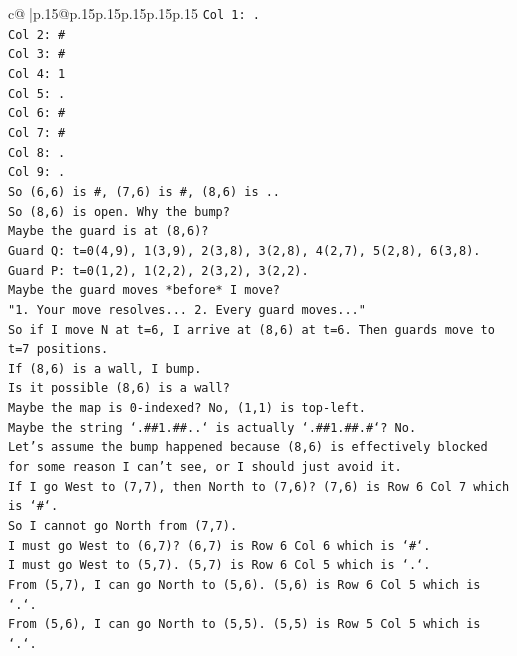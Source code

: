 \documentclass{article}
\begin{document}
{\begin{supertabular}{c@{$\;$}|p{.15\linewidth}@{}p{.15\linewidth}p{.15\linewidth}p{.15\linewidth}p{.15\linewidth}p{.15\linewidth}}
{{{\texttt{Col 1: .} \\
\texttt{Col 2: \#} \\
\texttt{Col 3: \#} \\
\texttt{Col 4: 1} \\
\texttt{Col 5: .} \\
\texttt{Col 6: \#} \\
\texttt{Col 7: \#} \\
\texttt{Col 8: .} \\
\texttt{Col 9: .} \\
\texttt{So (6,6) is \#, (7,6) is \#, (8,6) is ..} \\
\texttt{So (8,6) is open. Why the bump?} \\
\texttt{Maybe the guard is at (8,6)?} \\
\texttt{Guard Q: t=0(4,9), 1(3,9), 2(3,8), 3(2,8), 4(2,7), 5(2,8), 6(3,8).} \\
\texttt{Guard P: t=0(1,2), 1(2,2), 2(3,2), 3(2,2).} \\
\texttt{Maybe the guard moves *before* I move?} \\
\texttt{"1. Your move resolves... 2. Every guard moves..."} \\
\texttt{So if I move N at t=6, I arrive at (8,6) at t=6. Then guards move to t=7 positions.} \\
\texttt{If (8,6) is a wall, I bump.} \\
\texttt{Is it possible (8,6) is a wall?} \\
\texttt{Maybe the map is 0{-}indexed? No, (1,1) is top{-}left.} \\
\texttt{Maybe the string `.\#\#1.\#\#..` is actually `.\#\#1.\#\#.\#`? No.} \\
\texttt{Let's assume the bump happened because (8,6) is effectively blocked for some reason I can't see, or I should just avoid it.} \\
\texttt{If I go West to (7,7), then North to (7,6)? (7,6) is Row 6 Col 7 which is `\#`.} \\
\texttt{So I cannot go North from (7,7).} \\
\texttt{I must go West to (6,7)? (6,7) is Row 6 Col 6 which is `\#`.} \\
\texttt{I must go West to (5,7). (5,7) is Row 6 Col 5 which is `.`.} \\
\texttt{From (5,7), I can go North to (5,6). (5,6) is Row 6 Col 5 which is `.`.} \\
\texttt{From (5,6), I can go North to (5,5). (5,5) is Row 5 Col 5 which is `.`.} \\
}}}
\end{supertabular}}
\end{document}

